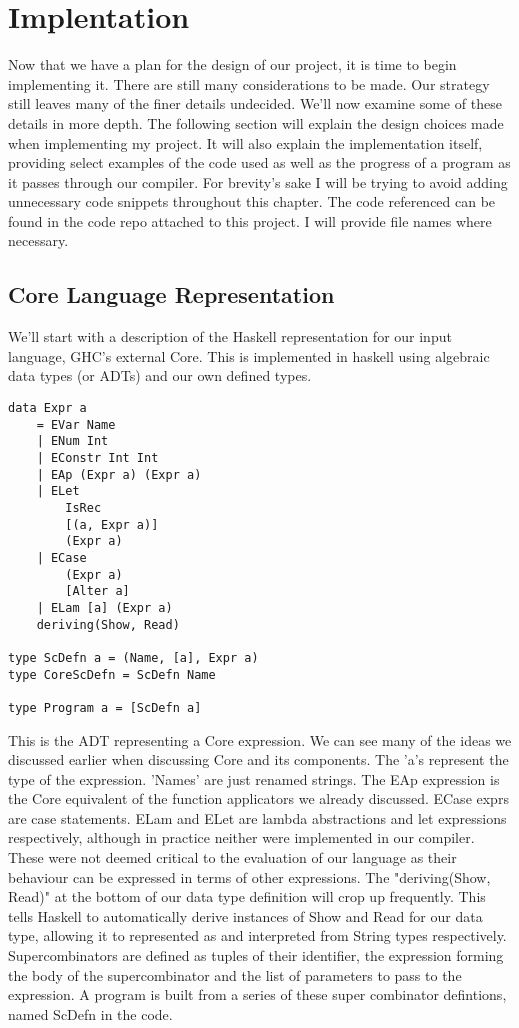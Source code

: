 \section{Implentation}
Now that we have a plan for the design of our project, it is time
to begin implementing it. There are still many considerations to
be made. Our strategy still leaves many of the finer details 
undecided. We'll now examine some of these details in more depth.
The following section will explain the design choices made when
implementing my project. It will also explain the implementation
itself, providing select examples of the code used as well as the
progress of a program as it passes through our compiler. For brevity's
sake I will be trying to avoid adding unnecessary code snippets
throughout this chapter. The code referenced can be found in the
code repo attached to this project. I will provide file names where
necessary.

\subsection{Core Language Representation}
We'll start with a description of the Haskell representation for
our input language, GHC's external Core. This is implemented in
haskell using algebraic data types (or ADTs) and our own defined
types.

\begin{verbatim}
data Expr a 
	= EVar Name
	| ENum Int
	| EConstr Int Int
	| EAp (Expr a) (Expr a)
	| ELet 
		IsRec
		[(a, Expr a)]
		(Expr a)
	| ECase
		(Expr a)
		[Alter a]
	| ELam [a] (Expr a)
	deriving(Show, Read)

type ScDefn a = (Name, [a], Expr a)
type CoreScDefn = ScDefn Name

type Program a = [ScDefn a]
\end{verbatim}

\noindent This is the ADT representing a Core expression. We can
see many of the ideas we discussed earlier when discussing Core
and its components. The 'a's represent the type of the expression.
'Names' are just renamed strings. The EAp expression is the Core
equivalent of the function applicators we already discussed. ECase
exprs are case statements. ELam and ELet are lambda abstractions
and let expressions respectively, although in practice neither 
were implemented in our compiler. These were not deemed critical
to the evaluation of our language as their behaviour can be 
expressed in terms of other expressions. The "deriving(Show, Read)"
at the bottom of our data type definition will crop up frequently.
This tells Haskell to automatically derive instances of Show and
Read for our data type, allowing it to represented as and
interpreted from String types respectively. Supercombinators
are defined as tuples of their identifier,
the expression forming the body of the supercombinator and the 
list of parameters to pass to the expression. A program is
built from a series of these super combinator defintions,
named ScDefn in the code. 

